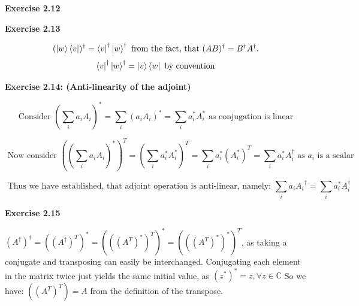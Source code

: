 \documentclass{article}
\begin{document}
\bigskip

\begin{framed}
    \noindent \textbf{Exercise 2.12}
    
    \medskip
    
    
\end{framed}

\bigskip

\begin{framed}
    \noindent \textbf{Exercise 2.13}
    
    \medskip

    $$
    (\ket{w}\bra{v})^{\dagger} = \bra{v}^{\dagger}\ket{w}^{\dagger} \text{ from the fact, that } (AB)^{\dagger} = B^{\dagger}A^{\dagger}. 
    $$
    $$
        \bra{v}^{\dagger}\ket{w}^{\dagger} = \ket{v}\bra{w} \text{ by convention}
    $$
    
\end{framed}

\bigskip

\begin{framed}
    \noindent \textbf{Exercise 2.14: (Anti-linearity of the adjoint)}
    
    \medskip

    $$
    \text{Consider } (\sum_i{a_iA_i})^{*} = \sum_i{(a_iA_i)^{*}} = \sum_i{a_i^*A_i^*} \text{ as conjugation is linear}
    $$

    $$
    \text{ Now consider } ((\sum_i{a_iA_i})^{*})^{T} = (\sum_i{a_i^*A_i^*})^{T} = \sum_i{a_i^*(A_i^*)^{T}} = \sum_i{a_i^*A_i^{\dagger}}\text{ as } a_i \text{ is a scalar }
    $$

    $$
    \text{ Thus we have established, that adjoint operation is anti-linear, namely: } \sum_i{a_iA_i}^{\dagger} = \sum_i{a_i^{*}A_i^{\dagger}}
    $$
    
    
\end{framed}

\bigskip

\begin{framed}
    \noindent \textbf{Exercise 2.15}
    
    \medskip
    
    $(A^{\dagger})^{\dagger} = ((A^{\dagger})^{T})^{*} = (((A^{T})^{*})^{T})^{*} = (((A^{T})^{*})^{*})^{T}$, as taking a conjugate and transposing can easily be interchanged. Conjugating each element in the matrix twice just yields the same initial value, as $(z^{*})^{*} = z , \forall z \in \mathbb{C}$ So we have: $((A^T)^T) = A$ from the definition of the transpose. 
    
\end{framed}
\end{document}
